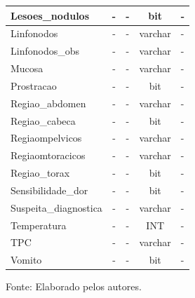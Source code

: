 \documentclass[
    12pt,               %
    openright,          %
    oneside,
    a4paper,            %
    BIBLATEX,           %
    TODO,               %
    english,            %
    brazil              %
    ]{ifsp-spo-inf-ctds}
\begin{document}
\begin{center}
\begin{quadro}[H]
\begin{tabulary}{1.0\textwidth}{|p{9em}|c|c|c|p{19em}|}
                  Lesoes\_nodulos & - & - & bit & -\\
                  \hline
                  Linfonodos & - & - & varchar & -\\
                  \hline
                  Linfonodos\_obs & - & - & varchar & -\\
                  \hline
                  Mucosa & - & - & varchar & -\\
                  \hline
                  Prostracao & - & - & bit & -\\
                  \hline
                  Regiao\_abdomen & - & - & varchar & -\\
                  \hline
                  Regiao\_cabeca & - & - & bit & -\\
                  \hline
                  Regiaompelvicos & - & - & varchar & -\\
                  \hline
                  Regiaomtoracicos & - & - & varchar & -\\
                  \hline
                  Regiao\_torax & - & - & bit & -\\
                  \hline
                  Sensibilidade\_dor & - & - & bit & -\\
                  \hline
                  Suspeita\_diagnostica & - & - & varchar & -\\
                  \hline
                  Temperatura & - & - & INT & -\\
                  \hline
                  TPC & - & - & varchar & -\\
                  \hline
                  Vomito & - & - & bit & -\\
                  \hline
                  \end{tabulary}
                  \label{qd: md-prontuario}
                  \centering
                  \footnotesize Fonte: Elaborado pelos autores.
                \end{quadro}
            \end{center} 
\end{document}

